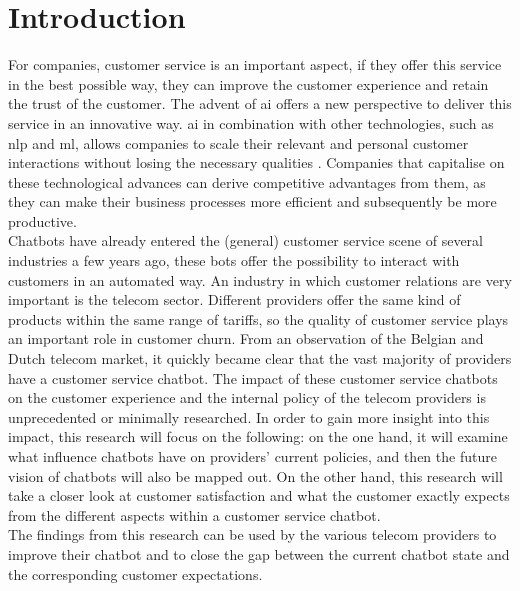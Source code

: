 \mainmatter
\pagestyle{headings}

\chapter{Introduction}
\label{ch:introduction}
For companies, customer service is an important aspect, if they offer this service in the best possible way, they can improve the customer experience and retain the trust of the customer. 
The advent of \acrfull{ai} offers a new perspective to deliver this service in an innovative way. \acrshort{ai} in combination with other technologies, such as \acrshort{nlp} and \acrshort{ml}, allows companies to scale their relevant and personal customer interactions without losing the necessary qualities \citep*{Quintino2019, Wilson2017}. Companies that capitalise on these technological advances can derive competitive advantages from them, as they can make their business processes more efficient and subsequently be more productive.\\
\break
Chatbots have already entered the (general) customer service scene of several industries a few years ago, these bots offer the possibility to interact with customers in an automated way. An industry in which customer relations are very important is the telecom sector. Different providers offer the same kind of products within the same range of tariffs, so the quality of customer service plays an important role in customer churn. From an observation of the Belgian and Dutch telecom market, it quickly became clear that the vast majority of providers have a customer service chatbot. The impact of these customer service chatbots on the customer experience and the internal policy of the telecom providers is unprecedented or minimally researched. In order to gain more insight into this impact, this research will focus on the following: on the one hand, it will examine what influence chatbots have on providers' current policies, and then the future vision of chatbots will also be mapped out. On the other hand, this research will take a closer look at customer satisfaction and what the customer exactly expects from the different aspects within a customer service chatbot.\\
\break
The findings from this research can be used by the various telecom providers to improve their chatbot and to close the gap between the current chatbot state and the corresponding customer expectations.